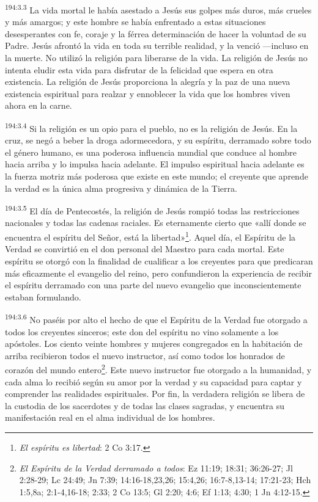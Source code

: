 \par
\textsuperscript{194:3.3} La vida mortal le había asestado a Jesús sus golpes más duros, más crueles y más amargos; y este hombre se había enfrentado a estas situaciones desesperantes con fe, coraje y la férrea determinación de hacer la voluntad de su Padre. Jesús afrontó la vida en toda su terrible realidad, y la venció ---incluso en la muerte. No utilizó la religión para liberarse de la vida. La religión de Jesús no intenta eludir esta vida para disfrutar de la felicidad que espera en otra existencia. La religión de Jesús proporciona la alegría y la paz de una nueva existencia espiritual para realzar y ennoblecer la vida que los hombres viven ahora en la carne.

\par
\textsuperscript{194:3.4} Si la religión es un opio para el pueblo, no es la religión de Jesús. En la cruz, se negó a beber la droga adormecedora, y su espíritu, derramado sobre todo el género humano, es una poderosa influencia mundial que conduce al hombre hacia arriba y lo impulsa hacia adelante. El impulso espiritual hacia adelante es la fuerza motriz más poderosa que existe en este mundo; el creyente que aprende la verdad es la única alma progresiva y dinámica de la Tierra.

\par
\textsuperscript{194:3.5} El día de Pentecostés, la religión de Jesús rompió todas las restricciones nacionales y todas las cadenas raciales. Es eternamente cierto que «allí donde se encuentra el espíritu del Señor, está la libertad»\footnote{\textit{El espíritu es libertad}: 2 Co 3:17.}. Aquel día, el Espíritu de la Verdad se convirtió en el don personal del Maestro para cada mortal. Este espíritu se otorgó con la finalidad de cualificar a los creyentes para que predicaran más eficazmente el evangelio del reino, pero confundieron la experiencia de recibir el espíritu derramado con una parte del nuevo evangelio que inconscientemente estaban formulando.

\par
\textsuperscript{194:3.6} No paséis por alto el hecho de que el Espíritu de la Verdad fue otorgado a todos los creyentes sinceros; este don del espíritu no vino solamente a los apóstoles. Los ciento veinte hombres y mujeres congregados en la habitación de arriba recibieron todos el nuevo instructor, así como todos los honrados de corazón del mundo entero\footnote{\textit{El Espíritu de la Verdad derramado a todos}: Ez 11:19; 18:31; 36:26-27; Jl 2:28-29; Lc 24:49; Jn 7:39; 14:16-18,23,26; 15:4,26; 16:7-8,13-14; 17:21-23; Hch 1:5,8a; 2:1-4,16-18; 2:33; 2 Co 13:5; Gl 2:20; 4:6; Ef 1:13; 4:30; 1 Jn 4:12-15.}. Este nuevo instructor fue otorgado a la humanidad, y cada alma lo recibió según su amor por la verdad y su capacidad para captar y comprender las realidades espirituales. Por fin, la verdadera religión se libera de la custodia de los sacerdotes y de todas las clases sagradas, y encuentra su manifestación real en el alma individual de los hombres.

